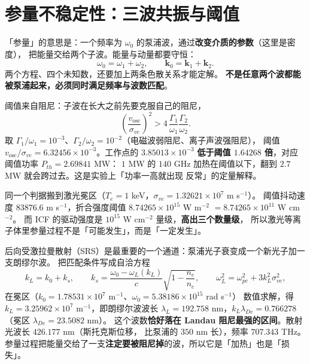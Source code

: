 \section{参量不稳定性：三波共振与阈值}
\label{sec:app-al-parametric}

「参量」的意思是：一个频率为 $\omega_0$ 的泵浦波，通过\textbf{改变介质的参数}（这里是密度），
把能量交给两个子波。能量与动量都要守恒：
\begin{equation}
\omega_0 = \omega_1 + \omega_2,
\qquad
\mathbf{k}_0 = \mathbf{k}_1 + \mathbf{k}_2 .
\label{eq:app-al-matching}
\end{equation}
两个方程、四个未知数，还要加上两条色散关系才能定解。
\textbf{不是任意两个波都能被泵浦起来，必须同时满足频率与波数匹配}。

阈值来自阻尼：子波在长大之前先要克服自己的阻尼，
\begin{equation}
\left(\frac{v_{\mathrm{osc}}}{\sigma_{ve}}\right)^{2}
> 4\,\frac{\Gamma_1}{\omega_1}\frac{\Gamma_2}{\omega_2}.
\label{eq:app-al-threshold}
\end{equation}
取 $\Gamma_1/\omega_1 = 10^{-3}$、$\Gamma_2/\omega_2 = 10^{-2}$（电磁波弱阻尼、离子声波强阻尼），
阈值 $v_{\mathrm{osc}}/\sigma_{ve} = 6.32456\times10^{-3}$。工作点的
$3.85013\times10^{-3}$ \textbf{低于阈值 $1.64268$ 倍}，对应阈值功率 $P_{th} = 2.69841$ MW：
$1$ MW 的 $140$ GHz 加热在阈值以下，翻到 $2.7$ MW 就会跨过去。这是实验上「功率一高就出现
反常」的定量解释。

同一个判据搬到激光冕区（$T_e = 1$ keV，$\sigma_{ve} = 1.32621\times10^{7}$ m s$^{-1}$）。
阈值抖动速度 $83876.6$ m s$^{-1}$，折合强度阈值
$8.74265\times10^{15}$ W m$^{-2}$ $= 8.74265\times10^{11}$ W cm$^{-2}$。
而 ICF 的驱动强度是 $10^{15}$ W cm$^{-2}$ 量级，\textbf{高出三个数量级}，
所以激光等离子体里参量过程不是「可能发生」，而是「一定发生」。

后向受激拉曼散射（SRS）是最重要的一个通道：泵浦光子衰变成一个新光子加一支朗缪尔波。
把匹配条件写成自洽方程
\begin{equation}
k_L = k_0 + k_s,
\qquad
k_s = \frac{\omega_0 - \omega_L(k_L)}{c}\sqrt{1 - \frac{n_e}{n_c}},
\qquad
\omega_L^2 = \omega_{pe}^2 + 3k_L^2\sigma_{ve}^2,
\label{eq:app-al-srs}
\end{equation}
在冕区（$k_0 = 1.78531\times10^{7}$ m$^{-1}$、$\omega_0 = 5.38186\times10^{15}$ rad s$^{-1}$）
数值求解，得 $k_L = 3.25962\times10^{7}$ m$^{-1}$，即朗缪尔波波长
$\lambda_L = 192.758$ nm，$k_L\lambda_{De} = 0.766278$（冕区 $\lambda_{De} = 23.5082$ nm）。
这个波数\textbf{恰好落在 Landau 阻尼最强的区间}。散射光波长 $426.177$ nm（斯托克斯位移，
比泵浦的 $350$ nm 长），频率 $707.343$ THz。
参量过程把能量交给了一支\textbf{注定要被阻尼掉}的波，所以它是「加热」也是「损失」。

